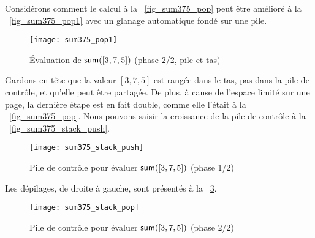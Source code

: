 Considérons comment le calcul à la \fig~\vref{fig_sum375_pop} peut
être amélioré à la \fig~\vref{fig_sum375_pop1} avec un glanage
automatique fondé sur une pile.
\begin{figure}[b]
\centering
\texttt{[image: sum375\_pop1]}
\caption{Évaluation de \(\textsf{sum}([3,7,5])\) (phase 2/2, pile et tas)
\label{fig_sum375_pop1}}
\end{figure}
Gardons en tête que la valeur \([3,7,5]\) est rangée dans le tas, pas
dans la pile de contrôle, et qu'elle peut être partagée. De plus, à
cause de l'espace limité sur une page, la dernière étape est en fait
double, comme elle l'était à la \fig~\vref{fig_sum375_pop}. Nous
pouvons saisir la croissance de la pile de contrôle à la
\fig~\vref{fig_sum375_stack_push}.
\begin{figure}
\centering
\texttt{[image: sum375\_stack\_push]}
\caption{Pile de contrôle pour évaluer \(\textsf{sum}([3,7,5])\) (phase
  1/2)
  \label{fig_sum375_stack_push}}
\end{figure}
Les dépilages, de droite à gauche, sont présentés à la
\fig~\ref{fig_sum375_stack_pop}.
\begin{figure}
\centering
\texttt{[image: sum375\_stack\_pop]}
\caption{Pile de contrôle pour évaluer \(\textsf{sum}([3,7,5])\) 
(phase 2/2)
\label{fig_sum375_stack_pop}}
\end{figure}

